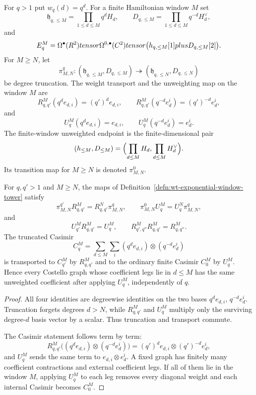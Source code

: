 \begin{defn}
\label{defn:wt-exponential-window-tower}
  For \(q>1\) put \(w_q(d)=q^d\).  For a finite Hamiltonian
  window \(M\) set
  \[
    \mathfrak h_{q,\leq M}=\prod_{1\leq d\leq M}q^dH_d,\qquad
    D_{q,\leq M}=\prod_{1\leq d\leq M}q^{-d}H_d^\vee,
  \]
  and
  \[
    \mathcal E_{q}^{M}
      =\Omega^\bullet(\R^2)\widehat\otimes
        \Omega^{0,\bullet}(\C^2)\widehat\otimes
      \bigl(\mathfrak h_{q,\leq M}[1]\oplus D_{q,\leq M}[2]\bigr).
  \]
  For \(M\geq N\), let
  \[
    \pi^q_{M,N}\colon
    (\mathfrak h_{q,\leq M},D_{q,\leq M})
      \twoheadrightarrow
    (\mathfrak h_{q,\leq N},D_{q,\leq N})
  \]
  be degree truncation.  The weight transport and the unweighting map
  on the window \(M\) are
  \[
    R^M_{q,q'}(q^de_{d,i})=(q')^de_{d,i},\qquad
    R^M_{q,q'}(q^{-d}e_d^i)=(q')^{-d}e_d^i,
  \]
  and
  \[
    U^M_q(q^de_{d,i})=e_{d,i},\qquad
    U^M_q(q^{-d}e_d^i)=e_d^i.
  \]
  The finite-window unweighted endpoint is the finite-dimensional pair
  \[
    (\mathfrak h_{\leq M},D_{\leq M})
      =\Bigl(\prod_{d\leq M}H_d,\prod_{d\leq M}H_d^\vee\Bigr).
  \]
  Its transition map for \(M\geq N\) is denoted
  \(\pi^0_{M,N}\).
\end{defn}

\begin{lem}
\label{lem:wt-window-transport-squares}
  For \(q,q'>1\) and \(M\geq N\), the maps of
  Definition~\ref{defn:wt-exponential-window-tower} satisfy
  \[
    \pi^{q'}_{M,N}R^M_{q,q'}=R^N_{q,q'}\pi^q_{M,N},\qquad
    \pi^0_{M,N}U^M_q=U^N_q\pi^q_{M,N},
  \]
  and
  \[
    U^M_{q'}R^M_{q,q'}=U^M_q,\qquad
    R^M_{q',q''}R^M_{q,q'}=R^M_{q,q''}.
  \]
  The truncated Casimir
  \[
    C^M_q=\sum_{d\leq M}\sum_i
      (q^de_{d,i})\otimes(q^{-d}e_d^i)
  \]
  is transported to \(C^M_{q'}\) by \(R^M_{q,q'}\) and to the
  ordinary finite Casimir \(C^M_0\) by \(U^M_q\).  Hence every
  Costello graph whose coefficient legs lie in \(d\leq M\) has the
  same unweighted coefficient after applying \(U^M_q\), independently
  of \(q\).
\end{lem}

\begin{proof}
  All four identities are degreewise identities on the two bases
  \(q^de_{d,i}\), \(q^{-d}e_d^i\).  Truncation forgets degrees
  \(d>N\), while \(R^M_{q,q'}\) and \(U^M_q\) multiply only the
  surviving degree-\(d\) basis vector by a scalar.  Thus truncation and
  transport commute.

  The Casimir statement follows term by term:
  \[
    R^M_{q,q'}\bigl((q^de_{d,i})\otimes(q^{-d}e_d^i)\bigr)
      =(q')^de_{d,i}\otimes(q')^{-d}e_d^i,
  \]
  and \(U^M_q\) sends the same term to
  \(e_{d,i}\otimes e_d^i\).  A fixed graph has finitely many
  coefficient contractions and external coefficient legs.  If all of
  them lie in the window \(M\), applying \(U^M_q\) to each leg removes
  every diagonal weight and each internal Casimir becomes \(C^M_0\).
\end{proof}

